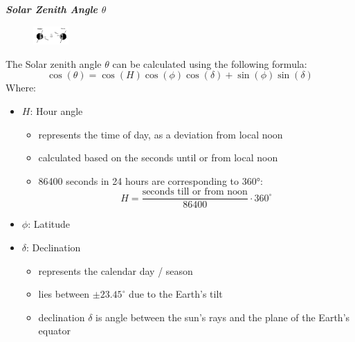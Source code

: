 \documentclass[fontsize=8pt, a4paper, landscape, fleqn]{scrartcl}
\renewcommand{\subsubsection}[1]{%
    \noindent\textbf{\textit{\color{subsectioncolor}#1}}%
    \vspace{1mm}%
}
\begin{document}
\begin{multicols*}{3}[\raggedcolumns]
\subsubsection{Solar Zenith Angle $\theta$}
\begin{figure}
    \centering
    \includegraphics[width=0.12\textwidth]{Secondary/img/Pasted image 20250408115014.png}
\end{figure}
The Solar zenith angle $\theta$ can be calculated using the following formula:
$$\cos(\theta) = \cos(H) \cos(\phi) \cos(\delta) + \sin(\phi) \sin(\delta)$$
Where:
\begin{itemize}
    \item $H$: Hour angle
        \begin{itemize}
            \item represents the time of day, as a deviation from local noon
            \item calculated based on the seconds until or from local noon
            \item 86400 seconds in 24 hours are corresponding to 360°: $$H = \frac{\text{seconds till or from noon}}{86400} \cdot 360^\circ$$
        \end{itemize}
    \item $\phi$: Latitude
    \item $\delta$: Declination
        \begin{itemize}
            \item represents the calendar day / season
            \item lies between $\pm 23.45^\circ$ due to the Earth's tilt
            \item declination $\delta$ is angle between the sun's rays and the plane of the Earth's equator
        \end{itemize}
\end{itemize}


\end{multicols*}
\end{document}
